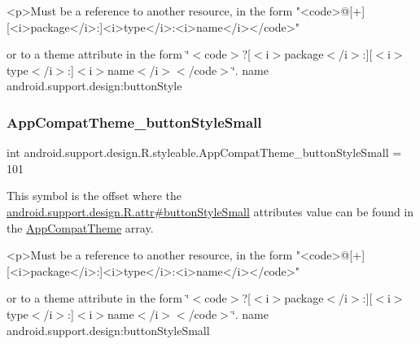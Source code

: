 \begin{DoxyVerb}      <p>Must be a reference to another resource, in the form "<code>@[+][<i>package</i>:]<i>type</i>:<i>name</i></code>"
\end{DoxyVerb}
 or to a theme attribute in the form \char`\"{}$<$code$>$?\mbox{[}$<$i$>$package$<$/i$>$\+:\mbox{]}\mbox{[}$<$i$>$type$<$/i$>$\+:\mbox{]}$<$i$>$name$<$/i$>$$<$/code$>$\char`\"{}.  name android.\+support.\+design\+:button\+Style \mbox{\label{classandroid_1_1support_1_1design_1_1R_1_1styleable_ab5e406e1fb26b0441b85e2dc760d1898}} 
\subsubsection{\texorpdfstring{App\+Compat\+Theme\+\_\+button\+Style\+Small}{AppCompatTheme\_buttonStyleSmall}}
{\footnotesize\ttfamily int android.\+support.\+design.\+R.\+styleable.\+App\+Compat\+Theme\+\_\+button\+Style\+Small = 101\hspace{0.3cm}{\ttfamily [static]}}

This symbol is the offset where the \hyperlink{classandroid_1_1support_1_1design_1_1R_1_1attr_a60fe75448db0912a195a7f3f56f3cbe3}{android.\+support.\+design.\+R.\+attr\#button\+Style\+Small} attribute\textquotesingle{}s value can be found in the \hyperlink{classandroid_1_1support_1_1design_1_1R_1_1styleable_afb351dc8de20cbd4c89abe360373010c}{App\+Compat\+Theme} array.

\begin{DoxyVerb}      <p>Must be a reference to another resource, in the form "<code>@[+][<i>package</i>:]<i>type</i>:<i>name</i></code>"
\end{DoxyVerb}
 or to a theme attribute in the form \char`\"{}$<$code$>$?\mbox{[}$<$i$>$package$<$/i$>$\+:\mbox{]}\mbox{[}$<$i$>$type$<$/i$>$\+:\mbox{]}$<$i$>$name$<$/i$>$$<$/code$>$\char`\"{}.  name android.\+support.\+design\+:button\+Style\+Small \mbox{\label{classandroid_1_1support_1_1design_1_1R_1_1styleable_a02bb9011b2cb08a21cec78bbaccf85f0}} 
